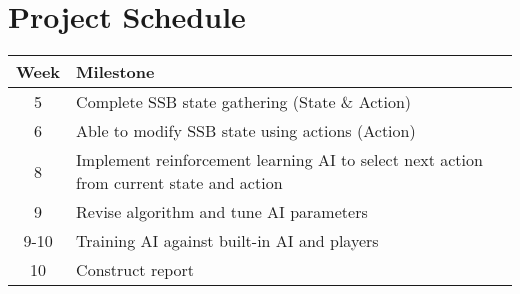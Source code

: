 \chapter*{Project Schedule}

\begin{tabular}{c | l}
Week & Milestone\\
\hline
5 & Complete SSB state gathering (State \& Action) \\
6 & Able to modify SSB state using actions (Action) \\
8 & Implement reinforcement learning AI to select next action from current state and action \\
9 & Revise algorithm and tune AI parameters \\
9-10 & Training AI against built-in AI and players \\
10 & Construct report \\
\end{tabular}
